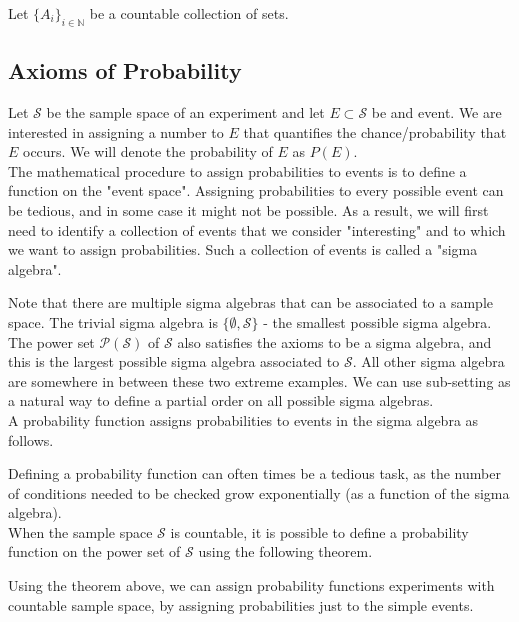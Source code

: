 Let $\{A_i\}_{i\in\mathbb{N}}$ be a countable collection of sets. 








\subsection[Axioms of Probability]{Axioms of Probability}
Let $\mathcal{S}$ be the sample space of an experiment and let $E\subset \mathcal{S}$ be and event. We are interested in assigning a number to $E$ that quantifies the chance/probability that $E$ occurs. We will denote the probability of $E$ as $P(E)$.
\\
The mathematical procedure to assign probabilities to events is to define a function on the "event space". Assigning probabilities to every possible event can be tedious, and in some case it might not be possible. As a result, we will first need to identify a collection of events that we consider "interesting" and to which we want to assign probabilities. Such a collection of events is called a "sigma algebra". 


Note that there are multiple sigma algebras that can be associated to a sample space. The trivial sigma algebra is $\{\emptyset, \mathcal{S}\}$ - the smallest possible sigma algebra. The power set $\mathcal{P}(\mathcal{S})$ of $\mathcal{S}$ also satisfies the axioms to be a sigma algebra, and this is the largest possible sigma algebra associated to $\mathcal{S}$. All other sigma algebra are somewhere in between these two extreme examples. We can use sub-setting as a natural way to define a partial order on all possible sigma algebras. 
\\

A probability function assigns probabilities to events in the sigma algebra as follows.




Defining a probability function can often times be a tedious task, as the number of conditions needed to be checked grow exponentially (as a function of the sigma algebra). 
\\
When the sample space $\mathcal{S}$ is countable, it is possible to define a probability function on the power set of $\mathcal{S}$ using the following theorem.



Using the theorem above, we can assign probability functions experiments with countable sample space, by assigning probabilities just to the simple events. 



